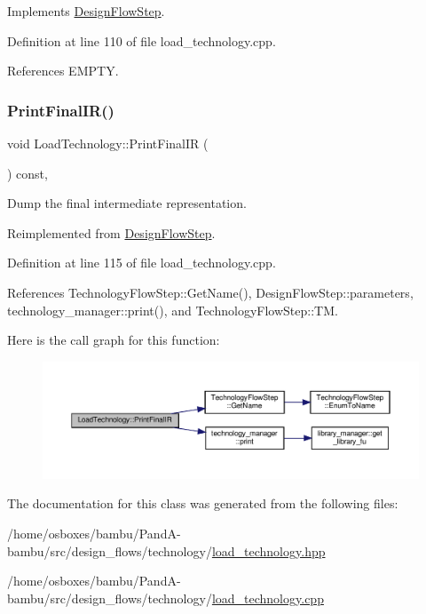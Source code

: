 Implements \hyperlink{classDesignFlowStep_a77d7e38493016766098711ea24f60b89}{Design\+Flow\+Step}.



Definition at line 110 of file load\+\_\+technology.\+cpp.



References E\+M\+P\+TY.

\mbox{\label{classLoadTechnology_a4f0526d4eb5b2a5be97a670e9ad580e2}} 
\subsubsection{\texorpdfstring{Print\+Final\+I\+R()}{PrintFinalIR()}}
{\footnotesize\ttfamily void Load\+Technology\+::\+Print\+Final\+IR (\begin{DoxyParamCaption}{ }\end{DoxyParamCaption}) const\hspace{0.3cm}{\ttfamily [override]}, {\ttfamily [virtual]}}



Dump the final intermediate representation. 



Reimplemented from \hyperlink{classDesignFlowStep_a1d30b6b575c459521803a388a2085d60}{Design\+Flow\+Step}.



Definition at line 115 of file load\+\_\+technology.\+cpp.



References Technology\+Flow\+Step\+::\+Get\+Name(), Design\+Flow\+Step\+::parameters, technology\+\_\+manager\+::print(), and Technology\+Flow\+Step\+::\+TM.

Here is the call graph for this function\+:
\nopagebreak
\begin{figure}[H]
\begin{center}
\leavevmode
\includegraphics[width=350pt]{dc/d88/classLoadTechnology_a4f0526d4eb5b2a5be97a670e9ad580e2_cgraph}
\end{center}
\end{figure}


The documentation for this class was generated from the following files\+:\begin{DoxyCompactItemize}
\item 
/home/osboxes/bambu/\+Pand\+A-\/bambu/src/design\+\_\+flows/technology/\hyperlink{load__technology_8hpp}{load\+\_\+technology.\+hpp}\item 
/home/osboxes/bambu/\+Pand\+A-\/bambu/src/design\+\_\+flows/technology/\hyperlink{load__technology_8cpp}{load\+\_\+technology.\+cpp}\end{DoxyCompactItemize}
